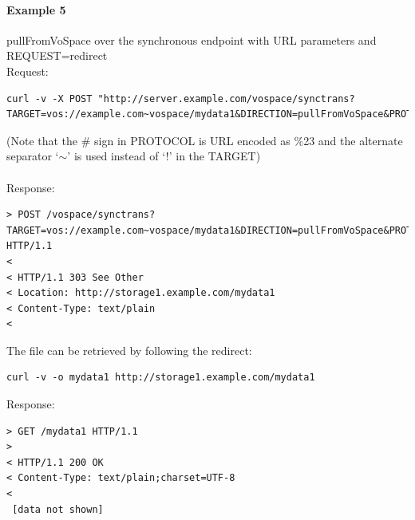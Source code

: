 \documentclass[11pt,a4paper]{ivoa}
\begin{document}
\paragraph{Example 5}
pullFromVoSpace over the synchronous endpoint with URL parameters and REQUEST=redirect
\\[5px]
\noindent
Request:
\begin{lstlisting}
curl -v -X POST "http://server.example.com/vospace/synctrans?TARGET=vos://example.com~vospace/mydata1&DIRECTION=pullFromVoSpace&PROTOCOL=ivo://ivoa.net/vospace/core%23httpget&REQUEST=redirect"
\end{lstlisting}
(Note that the \# sign in PROTOCOL is URL encoded as \%23 and the alternate separator `$\mathtt{\sim}$' is used instead of `!' in the TARGET) \\
\\
Response:
\begin{lstlisting}
> POST /vospace/synctrans?TARGET=vos://example.com~vospace/mydata1&DIRECTION=pullFromVoSpace&PROTOCOL=ivo://ivoa.net/vospace/core\%23httpget&REQUEST=redirect HTTP/1.1
<
< HTTP/1.1 303 See Other
< Location: http://storage1.example.com/mydata1
< Content-Type: text/plain
<
\end{lstlisting}
The file can be retrieved by following the redirect:
\begin{lstlisting}
curl -v -o mydata1 http://storage1.example.com/mydata1
\end{lstlisting}
Response:
\begin{lstlisting}
> GET /mydata1 HTTP/1.1
>
< HTTP/1.1 200 OK
< Content-Type: text/plain;charset=UTF-8
<
 [data not shown]
\end{lstlisting}
\end{document}
